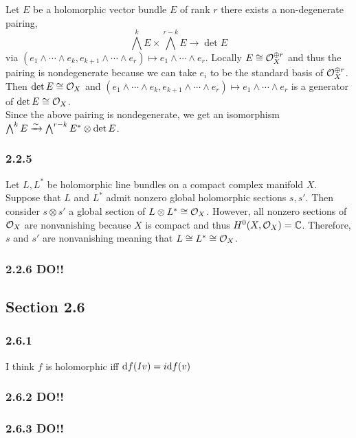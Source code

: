 \documentclass[12pt]{article}
\begin{document}
Let $E$ be a holomorphic vector bundle $E$ of rank $r$ there exists a non-degenerate pairing,
\[ \bigwedge^k E \times \bigwedge^{r-k} E \to \det{E} \]
via $(e_1 \wedge \cdots \wedge e_k, e_{k+1} \wedge \cdots \wedge e_{r}) \mapsto e_1 \wedge \cdots \wedge e_r$. Locally $E \cong \mathcal{O}_{X}^{\oplus r}$ and thus the pairing is nondegenerate because we can take $e_i$ to be the standard basis of $\mathcal{O}_{X}^{\oplus r}$. Then $\det{E} \cong \mathcal{O}_{X}$ and $(e_1 \wedge \cdots \wedge e_k, e_{k+1} \wedge \cdots \wedge e_{r}) \mapsto e_1 \wedge \cdots \wedge e_r$ is a generator of $\det{E} \cong \mathcal{O}_{X}$.
\bigskip\\
Since the above pairing is nondegenerate, we get an isomorphism $\bigwedge^k E \xrightarrow{\sim} \bigwedge^{r-k} E^* \otimes \det{E}$.

\subsubsection{2.2.5}


Let $L, L^*$ be holomorphic line bundles on a compact complex manifold $X$. Suppose that $L$ and $L^*$ admit nonzero global holomorphic sections $s, s'$. Then consider $s \otimes s'$ a global section of $L \otimes L^* \cong \mathcal{O}_{X}$. However, all nonzero sections of $\mathcal{O}_{X}$ are nonvanishing because $X$ is compact and thus $H^0(X, \mathcal{O}_{X}) = \mathbb{C}$. Therefore, $s$ and $s'$ are nonvanishing meaning that $L \cong L^* \cong \mathcal{O}_{X}$.

\subsubsection{2.2.6 DO!!}

\subsection{Section 2.6}

\subsubsection{2.6.1}

I think $f$ is holomorphic iff $\mathrm{d}{f}(Iv) = i \mathrm{d}{f} (v)$

\subsubsection{2.6.2 DO!!}

\subsubsection{2.6.3 DO!!}
\end{document}
